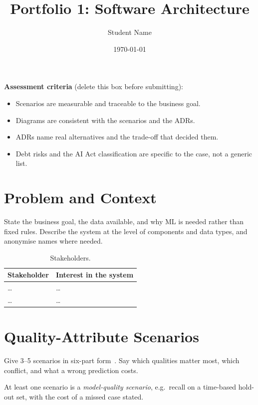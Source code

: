 \documentclass[report]{itvest}
\title{Portfolio 1: Software Architecture}
\author{Student Name} %
\date{\today}
\begin{document}
\maketitle

\begin{checkit}
  \textbf{Assessment criteria} (delete this box before submitting):
  \begin{itemize}
    \item Scenarios are measurable and traceable to the business goal.
    \item Diagrams are consistent with the scenarios and the ADRs.
    \item ADRs name real alternatives and the trade-off that decided them.
    \item Debt risks and the AI Act classification are specific to the case,
      not a generic list.
  \end{itemize}
\end{checkit}

\section{Problem and Context}

State the business goal, the data available, and why ML is needed rather
than fixed rules. Describe the system at the level of components and data
types, and anonymise names where needed.

\begin{table}[h]
  \centering
  \begin{tabularx}{\textwidth}{lX}
    \toprule
    Stakeholder & Interest in the system \\
    \midrule
    \ldots & \ldots \\
    \ldots & \ldots \\
    \bottomrule
  \end{tabularx}
  \caption{Stakeholders.}
  \label{tab:stakeholders}
\end{table}

\section{Quality-Attribute Scenarios}
\label{sec:scenarios}

Give 3--5 scenarios in six-part form~\cite{bass_software_2021}. Say which
qualities matter most, which conflict, and what a wrong prediction costs.

\begin{checkit}
  At least one scenario is a \emph{model-quality scenario}, e.g.\ recall on
  a time-based hold-out set, with the cost of a missed case stated.
\end{checkit}
\end{document}
